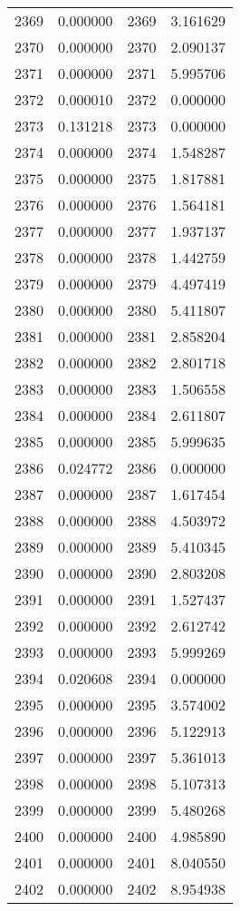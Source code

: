 \documentclass[12pt]{article}
\begin{document}
\begin{longtable}{@{}cccc@{}}
2369 & 0.000000 & 2369 & 3.161629 \\
2370 & 0.000000 & 2370 & 2.090137 \\
2371 & 0.000000 & 2371 & 5.995706 \\
2372 & 0.000010 & 2372 & 0.000000 \\
2373 & 0.131218 & 2373 & 0.000000 \\
2374 & 0.000000 & 2374 & 1.548287 \\
2375 & 0.000000 & 2375 & 1.817881 \\
2376 & 0.000000 & 2376 & 1.564181 \\
2377 & 0.000000 & 2377 & 1.937137 \\
2378 & 0.000000 & 2378 & 1.442759 \\
2379 & 0.000000 & 2379 & 4.497419 \\
2380 & 0.000000 & 2380 & 5.411807 \\
2381 & 0.000000 & 2381 & 2.858204 \\
2382 & 0.000000 & 2382 & 2.801718 \\
2383 & 0.000000 & 2383 & 1.506558 \\
2384 & 0.000000 & 2384 & 2.611807 \\
2385 & 0.000000 & 2385 & 5.999635 \\
2386 & 0.024772 & 2386 & 0.000000 \\
2387 & 0.000000 & 2387 & 1.617454 \\
2388 & 0.000000 & 2388 & 4.503972 \\
2389 & 0.000000 & 2389 & 5.410345 \\
2390 & 0.000000 & 2390 & 2.803208 \\
2391 & 0.000000 & 2391 & 1.527437 \\
2392 & 0.000000 & 2392 & 2.612742 \\
2393 & 0.000000 & 2393 & 5.999269 \\
2394 & 0.020608 & 2394 & 0.000000 \\
2395 & 0.000000 & 2395 & 3.574002 \\
2396 & 0.000000 & 2396 & 5.122913 \\
2397 & 0.000000 & 2397 & 5.361013 \\
2398 & 0.000000 & 2398 & 5.107313 \\
2399 & 0.000000 & 2399 & 5.480268 \\
2400 & 0.000000 & 2400 & 4.985890 \\
2401 & 0.000000 & 2401 & 8.040550 \\
2402 & 0.000000 & 2402 & 8.954938 \\

\end{longtable}
\end{document}
